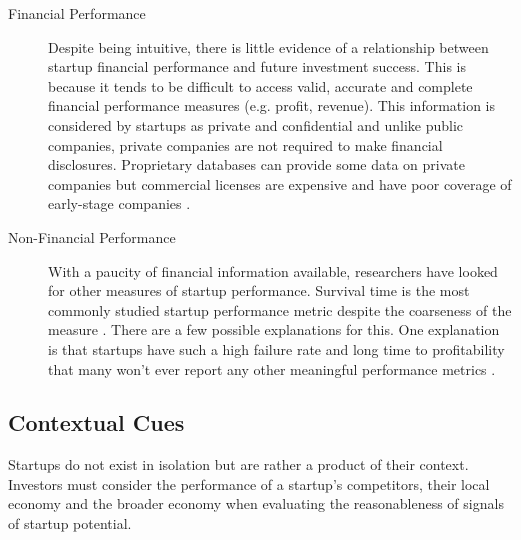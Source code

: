 \begin{description}

\item[Financial Performance]

Despite being intuitive, there is little evidence of a relationship between startup financial performance and future investment success. This is because it tends to be difficult to access valid, accurate and complete financial performance measures (e.g. profit, revenue). This information is considered by startups as private and confidential and unlike public companies, private companies are not required to make financial disclosures. Proprietary databases can provide some data on private companies but commercial licenses are expensive and have poor coverage of early-stage companies \cite{artemchik2015}.

\item[Non-Financial Performance]

With a paucity of financial information available, researchers have looked for other measures of startup performance. Survival time is the most commonly studied startup performance metric despite the coarseness of the measure \cite{song2012,an2015,gimmon2010}. There are a few possible explanations for this. One explanation is that startups have such a high failure rate and long time to profitability that many won't ever report any other meaningful performance metrics \cite{sahlman2010}.

\end{description}

\subsection{Contextual Cues}

Startups do not exist in isolation but are rather a product of their context. Investors must consider the performance of a startup's competitors, their local economy and the broader economy when evaluating the reasonableness of signals of startup potential.

